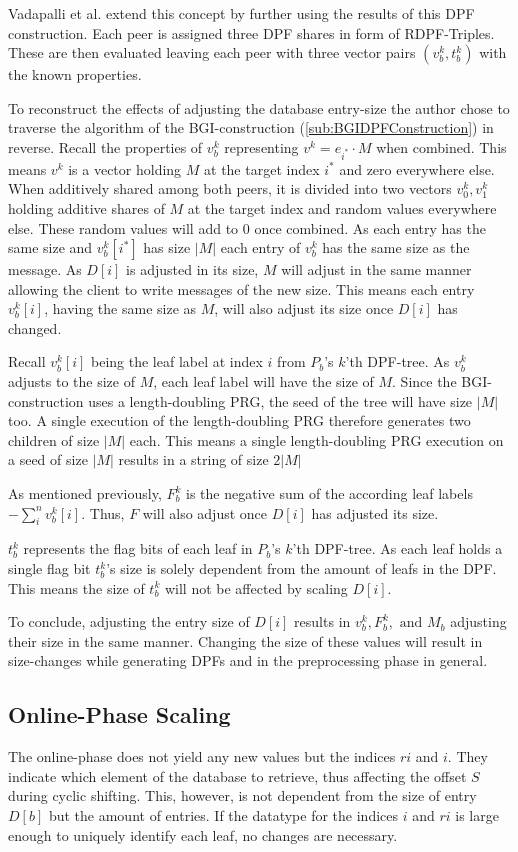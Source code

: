 Vadapalli et al. \cite{vadapalli2023duoram} extend this concept by further using the results of this DPF construction.
Each peer is assigned three DPF shares in form of RDPF-Triples.
These are then evaluated leaving each peer with three vector pairs $(v_b^k, t_b^k)$ with the known properties.

To reconstruct the effects of adjusting the database entry-size the author chose to traverse the algorithm of the BGI-construction (\ref{sub:BGIDPFConstruction}) in reverse.
Recall the properties of $v_b^k$ representing $v^k = e_{i^*}\cdot M$ when combined.
This means $v^k$ is a vector holding $M$ at the target index $i^*$ and zero everywhere else.
When additively shared among both peers, it is divided into two vectors $v_0^k,v_1^k$ holding additive shares of $M$ at the target index and random values everywhere else.
These random values will add to $0$ once combined.
As each entry has the same size and $v_b^k[i^*]$ has size $|M|$ each entry of $v_b^k$ has the same size as the message.
As $D[i]$ is adjusted in its size, $M$ will adjust in the same manner allowing the client to write messages of the new size.
This means each entry $v_b^k[i]$, having the same size as $M$, will also adjust its size once $D[i]$ has changed.

Recall $v_b^k[i]$ being the leaf label at index $i$ from $P_b$'s $k$'th DPF-tree.
As $v_b^k$ adjusts to the size of $M$, each leaf label will have the size of $M$.
Since the BGI-construction uses a length-doubling PRG, the seed of the tree will have size $|M|$ too.
A single execution of the length-doubling PRG therefore generates two children of size $|M|$ each.
This means a single length-doubling PRG execution on a seed of size $|M|$ results in a string of size $2|M|$

As mentioned previously, $F^k_b$ is the negative sum of the according leaf labels $-\sum^n_i{v_b^k[i]}$.
Thus, $F$ will also adjust once $D[i]$ has adjusted its size.

$t_b^k$ represents the flag bits of each leaf in $P_b$'s $k$'th DPF-tree.
As each leaf holds a single flag bit $t_b^k$'s size is solely dependent from the amount of leafs in the DPF.
This means the size of $t_b^k$ will not be affected by scaling $D[i]$.

To conclude, adjusting the entry size of $D[i]$ results in $v_b^k,F^k_b,\text{ and }M_b$ adjusting their size in the same manner.
Changing the size of these values will result in size-changes while generating DPFs and in the preprocessing phase in general.

\subsection*{Online-Phase Scaling} \label{subsub:ScalingDuringOnlinePhase}
The online-phase does not yield any new values but the indices $ri$ and $i$.
They indicate which element of the database to retrieve, thus affecting the offset $S$ during cyclic shifting.
This, however, is not dependent from the size of entry $D[b]$ but the amount of entries.
If the datatype for the indices $i$ and $ri$ is large enough to uniquely identify each leaf, no changes are necessary. 